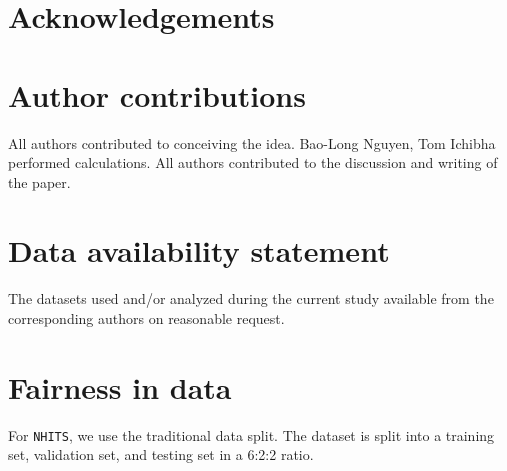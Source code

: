 \documentclass[aps,prb,groupedaddress,twocolumn,showpacs,dvipdfmx,superscriptaddress,pdftex]{revtex4-2}
\begin{document}
\section{Acknowledgements}

\section{Author contributions}
All authors contributed to conceiving the idea. Bao-Long Nguyen, Tom Ichibha performed calculations. All authors contributed to the discussion and writing of the paper.

\section{Data availability statement}
The datasets used and/or analyzed during the current study available from the corresponding authors on reasonable request.

% 



\appendix
\section{Fairness in data}
\label{app:data}


For \verb|NHITS|, we use the traditional data split. The dataset is split into a training set, validation set, and testing set in a 6:2:2 ratio.
\end{document}
